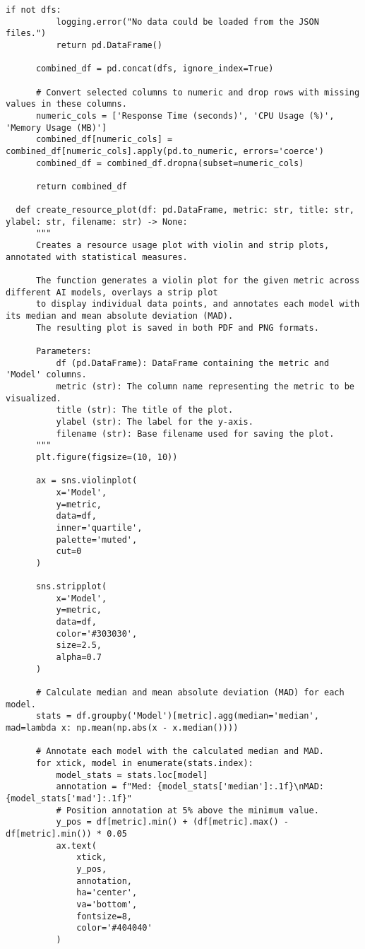 \begin{lstlisting}[style=Python, caption={Python-quantitative-data-analysis}, captionpos=b]
      if not dfs:
          logging.error("No data could be loaded from the JSON files.")
          return pd.DataFrame()
      
      combined_df = pd.concat(dfs, ignore_index=True)
      
      # Convert selected columns to numeric and drop rows with missing values in these columns.
      numeric_cols = ['Response Time (seconds)', 'CPU Usage (%)', 'Memory Usage (MB)']
      combined_df[numeric_cols] = combined_df[numeric_cols].apply(pd.to_numeric, errors='coerce')
      combined_df = combined_df.dropna(subset=numeric_cols)
      
      return combined_df
  
  def create_resource_plot(df: pd.DataFrame, metric: str, title: str, ylabel: str, filename: str) -> None:
      """
      Creates a resource usage plot with violin and strip plots, annotated with statistical measures.
      
      The function generates a violin plot for the given metric across different AI models, overlays a strip plot
      to display individual data points, and annotates each model with its median and mean absolute deviation (MAD).
      The resulting plot is saved in both PDF and PNG formats.
      
      Parameters:
          df (pd.DataFrame): DataFrame containing the metric and 'Model' columns.
          metric (str): The column name representing the metric to be visualized.
          title (str): The title of the plot.
          ylabel (str): The label for the y-axis.
          filename (str): Base filename used for saving the plot.
      """
      plt.figure(figsize=(10, 10))
      
      ax = sns.violinplot(
          x='Model',
          y=metric,
          data=df,
          inner='quartile',
          palette='muted',
          cut=0
      )
      
      sns.stripplot(
          x='Model',
          y=metric,
          data=df,
          color='#303030',
          size=2.5,
          alpha=0.7
      )
      
      # Calculate median and mean absolute deviation (MAD) for each model.
      stats = df.groupby('Model')[metric].agg(median='median', mad=lambda x: np.mean(np.abs(x - x.median())))
      
      # Annotate each model with the calculated median and MAD.
      for xtick, model in enumerate(stats.index):
          model_stats = stats.loc[model]
          annotation = f"Med: {model_stats['median']:.1f}\nMAD: {model_stats['mad']:.1f}"
          # Position annotation at 5% above the minimum value.
          y_pos = df[metric].min() + (df[metric].max() - df[metric].min()) * 0.05
          ax.text(
              xtick,
              y_pos,
              annotation,
              ha='center',
              va='bottom',
              fontsize=8,
              color='#404040'
          )
      

\end{lstlisting}
